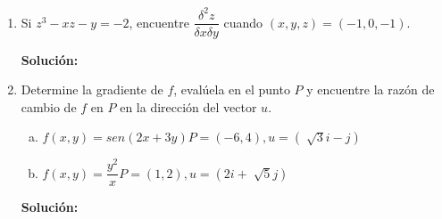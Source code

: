 \documentclass[12pt]{article}
\newenvironment{solucion}
{\begin{mdframed}[backgroundcolor=black!10]
		{\bf Solución:}\\
	}
	{
	\end{mdframed}
}
\newenvironment{preguntas}
{\begin{enumerate}\itemsep12pt
	}
	{
	\end{enumerate}
}
\begin{document}
\begin{preguntas}
\item Si $z^3 - xz - y = -2$, encuentre $\dfrac{\delta^2z}{\delta x \delta y}$ cuando $(x,y,z) = (-1, 0, -1)$.
\begin{solucion}

\end{solucion}
\item Determine la gradiente de $f$, evalúela en el punto $P$ y encuentre la razón de cambio de $f$ en $P$ en la dirección del vector $u$.
\begin{enumerate}[a)]
\item $f(x,y) = sen(2x+3y)$\tab$P=(-6,4), u=\left(\sqrt[]{3}i - j\right)$
\item $f(x,y) = \dfrac{y^2}{x}$\tab$P=(1,2), u=\left(2i + \sqrt[]{5}j\right)$
\end{enumerate}
\begin{solucion}


\end{solucion}
\end{preguntas}
\end{document}
